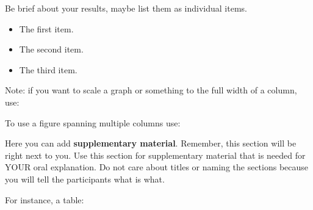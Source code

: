 \documentclass[a0paper,fleqn]{betterposter}
\newcommand{\fontsizecaption}{\fontsize{32.00}{45.33} \selectfont}
\begin{document}
{Be brief about your results, maybe list them as individual items.

\vspace*{0.5em}

\begin{itemize}
\item The first item.
\item The second item.
\item The third item.
\end{itemize}

\vspace*{0.5em}

Note: if you want to scale a graph or something to the full width of a column, use:

\vspace*{1.0em}


To use a figure spanning multiple columns use:


}{

Here you can add \textbf{supplementary material}. Remember, this section will be
right next to you.
Use this section for supplementary material that is needed for YOUR oral
explanation. Do not care about titles or naming the sections because you will
tell the participants what is what.

\vspace*{1.0em}

For instance, a table:


}
\end{document}
